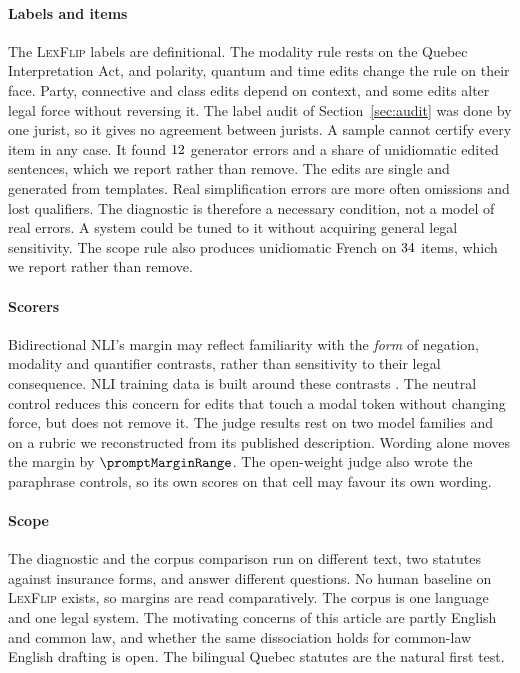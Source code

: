 \documentclass{BVP_JCLLT}
\newcommand{\rev}[1]{#1}
\newcommand{\rev}[1]{{\color{revcol}#1}}
\begin{document}
\rev{\paragraph{Labels and items}
The \textsc{LexFlip} labels are definitional. The modality rule rests on the
Quebec Interpretation Act, and polarity, quantum and time edits change the rule
on their face. Party, connective and class edits depend on context, and some
edits alter legal force without reversing it. The label audit of
Section~\ref{sec:audit} was done by one jurist, so it gives no agreement
between jurists. A sample cannot certify every item in any case. It found $12$ generator errors and a
share of unidiomatic edited sentences, which we report rather than remove. The edits are single and generated from templates. Real
simplification errors are more often omissions and lost qualifiers. The
diagnostic is therefore a necessary condition, not a model of real errors. A
system could be tuned to it without acquiring general legal sensitivity. The scope rule
also produces unidiomatic French on $34$ items, which we report rather
than remove.

\paragraph{Scorers}
Bidirectional NLI's margin may reflect familiarity with the \emph{form} of
negation, modality and quantifier contrasts, rather than sensitivity to their
legal consequence. NLI training data is built around these contrasts
\cite{naik2018stress,hossain2020negation}. The neutral control reduces this concern for edits that
touch a modal token without changing force, but does not remove it. The judge
results rest on two model families and on a rubric we reconstructed from its
published description. Wording alone moves the margin by
$\promptMarginRange$. The open-weight judge also wrote the paraphrase controls,
so its own scores on that cell may favour its own wording.

\paragraph{Scope}
The diagnostic and the corpus comparison run on different text, two statutes
against insurance forms, and answer different questions. No human baseline on
\textsc{LexFlip} exists, so margins are read comparatively. The corpus is one
language and one legal system. The motivating concerns of this article are
partly English and common law, and whether the same dissociation holds for
common-law English drafting is open. The bilingual Quebec statutes are the
natural first test.}
\end{document}
